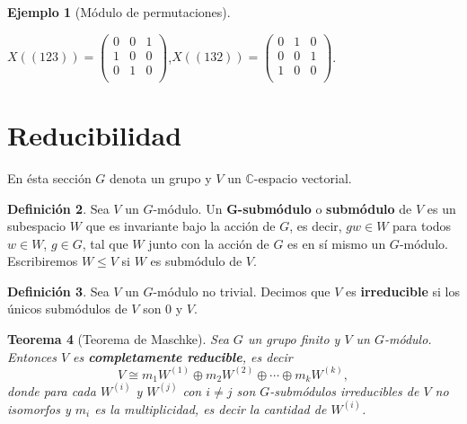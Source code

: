 \documentclass[12pt]{book}
\newtheorem{theorem}{Teorema}[section]
\theoremstyle{definition}
\newtheorem{definition}[theorem]{Definición}
\newtheorem{example}[theorem]{Ejemplo}
\newcounter{in}
\newcounter{ini}
\begin{document}
\begin{example}[Módulo de permutaciones]
  \begin{center}
    $X((123))=\begin{pmatrix}
      0 & 0 & 1 \\
      1 & 0 & 0 \\
      0 & 1 & 0 \\
    \end{pmatrix}$,\quad $X((132))=\begin{pmatrix}
      0 & 1 & 0 \\
      0 & 0 & 1 \\
      1 & 0 & 0 \\
    \end{pmatrix}$.
  \end{center}
\end{example}

\section{Reducibilidad}%
\label{reducibilidad}

En ésta sección $G$ denota un grupo y $V$ un $\mathbb{C}$-espacio vectorial.

\begin{definition}
  Sea $V$ un $G$-módulo. Un $\boldsymbol{G}$\textbf{-submódulo} o \textbf{submódulo} de $V$ es un subespacio
  $W$ que es invariante bajo la acción de $G$, es decir, $ gw\in W$
  para todos $w\in W$, $g\in G$, tal que $W$ junto con la acción de
  $G$ es en sí mismo un $G$-módulo. Escribiremos $W\leq V$ si $W$ es
  submódulo de $V$. 
\end{definition}

\begin{definition}
  Sea $V$ un $G$-módulo no trivial. Decimos que $V$ es \textbf{irreducible} si
  los únicos submódulos de $V$ son $0$ y $V$.
\end{definition}


\begin{theorem}[Teorema de Maschke]
  \label{maschke}
  Sea $G$ un grupo finito y $V$ un $G$-módulo. Entonces $V$ es
  \textbf{completamente reducible}, es decir
  \begin{equation*}
    V\cong m_{1}W^{(1)}\oplus m_{2}W^{(2)}\oplus\cdots \oplus m_{k}W^{(k)},
  \end{equation*}
donde para cada $W^{(i)}$ y $W^{(j)}$ con $i\neq j$ son $G$-submódulos
irreducibles de $V$ no isomorfos y $m_{i}$ es la multiplicidad, es
decir la cantidad de $W^{(i)}$.
\end{theorem}
\end{document}
